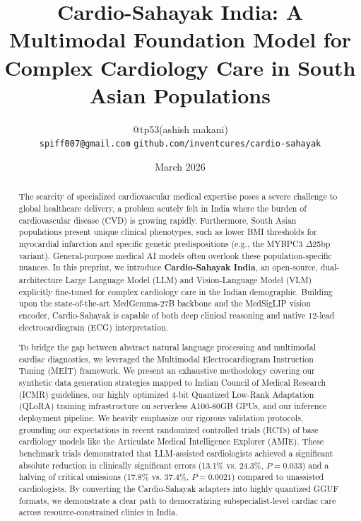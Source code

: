 \documentclass[11pt,a4paper]{article}
\title{\textbf{Cardio-Sahayak India: A Multimodal Foundation Model for Complex Cardiology Care in South Asian Populations}}
\author{
@tp53(ashish makani) \\
\texttt{spiff007@gmail.com}
\texttt{github.com/inventcures/cardio-sahayak}
}
\date{March 2026}
\begin{document}

\maketitle

\begin{abstract}
The scarcity of specialized cardiovascular medical expertise poses a severe challenge to global healthcare delivery, a problem acutely felt in India where the burden of cardiovascular disease (CVD) is growing rapidly. Furthermore, South Asian populations present unique clinical phenotypes, such as lower BMI thresholds for myocardial infarction and specific genetic predispositions (e.g., the MYBPC3 $\Delta$25bp variant). General-purpose medical AI models often overlook these population-specific nuances. In this preprint, we introduce \textbf{Cardio-Sahayak India}, an open-source, dual-architecture Large Language Model (LLM) and Vision-Language Model (VLM) explicitly fine-tuned for complex cardiology care in the Indian demographic. Building upon the state-of-the-art MedGemma-27B backbone and the MedSigLIP vision encoder, Cardio-Sahayak is capable of both deep clinical reasoning and native 12-lead electrocardiogram (ECG) interpretation. 

To bridge the gap between abstract natural language processing and multimodal cardiac diagnostics, we leveraged the Multimodal Electrocardiogram Instruction Tuning (MEIT) framework. We present an exhaustive methodology covering our synthetic data generation strategies mapped to Indian Council of Medical Research (ICMR) guidelines, our highly optimized 4-bit Quantized Low-Rank Adaptation (QLoRA) training infrastructure on serverless A100-80GB GPUs, and our inference deployment pipeline. We heavily emphasize our rigorous validation protocols, grounding our expectations in recent randomized controlled trials (RCTs) of base cardiology models like the Articulate Medical Intelligence Explorer (AMIE). These benchmark trials demonstrated that LLM-assisted cardiologists achieved a significant absolute reduction in clinically significant errors (13.1\% vs. 24.3\%, $P=0.033$) and a halving of critical omissions (17.8\% vs. 37.4\%, $P=0.0021$) compared to unassisted cardiologists. By converting the Cardio-Sahayak adapters into highly quantized GGUF formats, we demonstrate a clear path to democratizing subspecialist-level cardiac care across resource-constrained clinics in India. 
\end{abstract}
\end{document}
